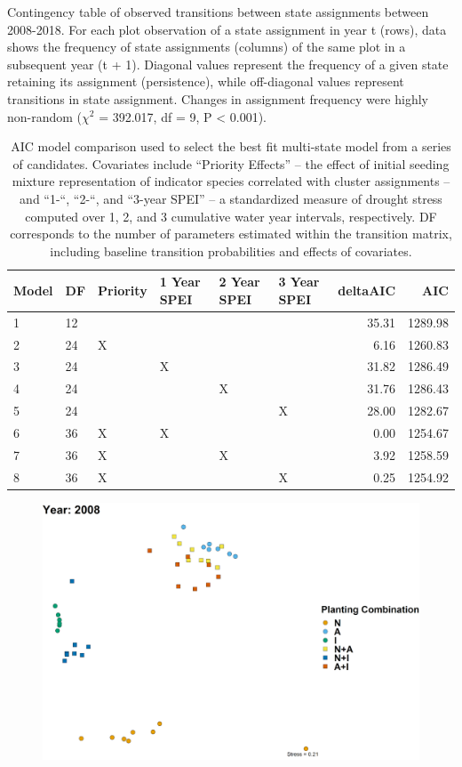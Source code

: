 \documentclass[twoside,12pt,final]{ucthesis-CA2012}
\begin{document}
\begin{ucmainmatter}
\begin{table}[ht]
{}
\caption{Contingency table of observed transitions between state assignments between 2008-2018. For each plot observation of a state assignment in year t (rows), data shows the frequency of state assignments (columns) of the same plot in a subsequent year (t + 1). Diagonal values represent the frequency of a given state retaining its assignment (persistence), while off-diagonal values represent transitions in state assignment. Changes in assignment frequency were highly non-random ($\chi^2$ = 392.017, df = 9, P < 0.001).} 
\end{table}
\begin{table}[ht]
\centering
\begin{tabular}{llllllrr}
  \hline
Model & DF & Priority & 1 Year SPEI & 2 Year SPEI & 3 Year SPEI & deltaAIC & AIC \\ 
  \hline
1 & 12 &  &  &  &  & 35.31 & 1289.98 \\ 
  2 & 24 & X &  &  &  & 6.16 & 1260.83 \\ 
  3 & 24 &  & X &  &  & 31.82 & 1286.49 \\ 
  4 & 24 &  &  & X &  & 31.76 & 1286.43 \\ 
  5 & 24 &  &  &  & X & 28.00 & 1282.67 \\ 
  6 & 36 & X & X &  &  & 0.00 & 1254.67 \\ 
  7 & 36 & X &  & X &  & 3.92 & 1258.59 \\ 
  8 & 36 & X &  &  & X & 0.25 & 1254.92 \\ 
   \hline
\end{tabular}
\caption{AIC model comparison used to select the best fit multi-state model from a series of candidates. Covariates include “Priority Effects” – the effect of initial seeding mixture representation of indicator species correlated with cluster assignments – and “1-“, “2-“, and “3-year SPEI” – a standardized measure of drought stress computed over 1, 2, and 3 cumulative water year intervals, respectively. DF corresponds to the number of parameters estimated within the transition matrix, including baseline transition probabilities and effects of covariates.} 
\end{table}
\begin{figure}
\centering
\includegraphics[width=\textwidth,height=0.5\textheight]{figure/AppFig3_1.png}

\end{figure}
\end{ucmainmatter}
\end{document}
